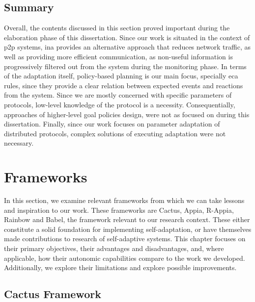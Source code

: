 \subsection{Summary}
\label{ssec:summary}

Overall, the contents discussed in this section proved important during the elaboration phase of this dissertation. Since our work is situated in the context of \gls{p2p} systems, \gls{ina}  provides an alternative approach that reduces network traffic, as well as providing more efficient communication, as non-useful information is progressively filtered out from the system during the monitoring phase. In terms of the adaptation itself, policy-based planning is our main focus, specially \gls{eca} rules, since they provide a clear relation between expected events and reactions from the system. Since we are mostly concerned with specific parameters of protocols, low-level knowledge of the protocol is a necessity. Consequentially, approaches of higher-level goal policies design, were not as focused on during this dissertation. Finally, since our work focuses on parameter adaptation of distributed protocols, complex solutions of executing adaptation were not necessary.
\section{Frameworks}
\label{sec:frameworks}

In this section, we examine relevant frameworks from which we can take lessons and inspiration to our work. These frameworks are Cactus, Appia, R-Appia, Rainbow and Babel, the framework relevant to our research context. These either constitute a solid foundation for implementing self-adaptation, or have themselves made contributions to research of self-adaptive systems. This chapter focuses on their primary objectives, their advantages and disadvantages, and, where applicable, how their autonomic capabilities compare to the work we developed. Additionally, we explore their limitations and explore possible improvements.
%
%
%
\subsection{Cactus Framework}
\label{ssec:cactusframework}

